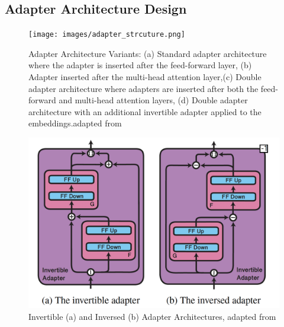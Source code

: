 \documentclass[conference]{IEEEtran}
\begin{document}
\subsection{Adapter Architecture Design}

\begin{figure}[htbp]
    \centering
    \texttt{[image: images/adapter\_strcuture.png]}
    \caption{Adapter Architecture Variants: (a) Standard adapter architecture where the adapter is inserted after the feed-forward layer, (b) Adapter inserted after the multi-head attention layer,(c) Double adapter architecture where adapters are inserted after both the feed-forward and multi-head attention layers, (d) Double adapter architecture with an additional invertible adapter applied to the embeddings.adapted from \cite{b7}}
\end{figure}


\begin{figure}[htbp]
    \centering
    \includegraphics[width=1\linewidth]{images/invertible_adapter.png}
    \caption{Invertible (a) and Inversed (b) Adapter Architectures, adapted from \cite{b13}}
\end{figure}
\end{document}
